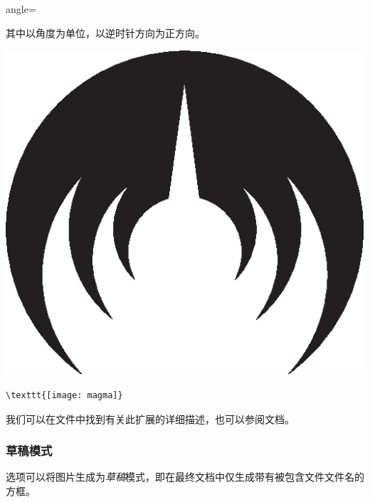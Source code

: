 \begin{dmd}
angle=
\end{dmd}

其中以角度为单位，以逆时针方向为正方向。

\begin{codelist}[5.4]{
\includegraphics[angle=45,
                 scale=0.2]{img/magma}
}\begin{verbatim}
\texttt{[image: magma]}
\end{verbatim}
\end{codelist}

我们可以在文件中找到有关此扩展的详细描述，也可以参阅文档。

\subsubsection{草稿模式}

选项可以将图片生成为\emph{草稿}模式，即在最终文档中仅生成带有被包含文件文件名的方框。

